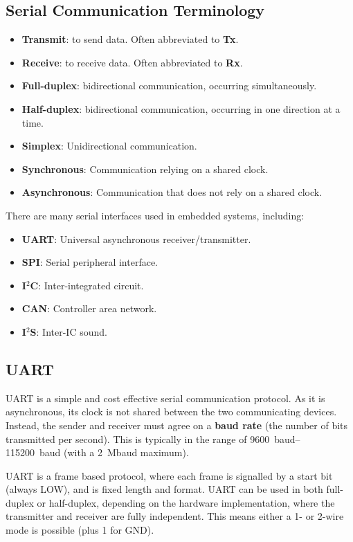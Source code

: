 \documentclass{report}
\begin{document}
\subsection{Serial Communication Terminology}
\begin{itemize}
    \item \textbf{Transmit}: to send data. Often abbreviated to \textbf{Tx}.
    \item \textbf{Receive}: to receive data. Often abbreviated to \textbf{Rx}.
    \item \textbf{Full-duplex}: bidirectional communication, occurring simultaneously.
    \item \textbf{Half-duplex}: bidirectional communication, occurring in one direction at a time.
    \item \textbf{Simplex}: Unidirectional communication.
    \item \textbf{Synchronous}: Communication relying on a shared clock.
    \item \textbf{Asynchronous}: Communication that does not rely on a shared clock.
\end{itemize}
There are many serial interfaces used in embedded systems, including:
\begin{itemize}
    \item \textbf{UART}: Universal asynchronous receiver/transmitter.
    \item \textbf{SPI}: Serial peripheral interface.
    \item \textbf{I\({}^2\)C}: Inter-integrated circuit.
    \item \textbf{CAN}: Controller area network.
    \item \textbf{I\({}^2\)S}: Inter-IC sound.
\end{itemize}
\subsection{UART}
UART is a simple and cost effective serial communication protocol. As it is asynchronous,
its clock is not shared between the two communicating devices. Instead, the sender and receiver
must agree on a \textbf{baud rate} (the number of bits transmitted per second). This is
typically in the range of \qtyrange[range-phrase=~to~]{9600}{115200}{baud} (with a \qty{2}{Mbaud} maximum).

UART is a frame based protocol, where each frame is signalled by a start bit (always LOW),
and is fixed length and format. UART can be used in both full-duplex or half-duplex,
depending on the hardware implementation, where the transmitter and receiver are
fully independent. This means either a 1- or 2-wire mode is possible (plus 1 for GND).
\end{document}
